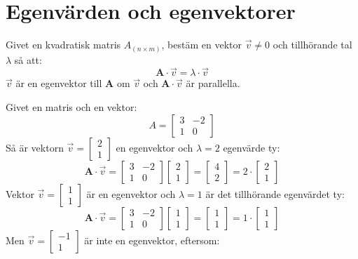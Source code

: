 \section{Egenvärden och egenvektorer} %
\label{sec:egenv_rden_och_egenvektorer}
Givet en kvadratisk matris $A_{(n \times m)}$, bestäm en vektor $\vec{v} \neq 0$ och tillhörande tal $\lambda$ så att:
\[
\mathbf{A} \cdot \vec{v} = \lambda \cdot \vec{v}
\]
$\vec{v}$ är en egenvektor till \textbf{A} om $\vec{v}$ och $\mathbf{A} \cdot \vec{v}$ är parallella.
\begin{Ex}
	Givet en matris och en vektor:
	\[
	A = \begin{bmatrix} 3&-2\\1&0 \end{bmatrix}
	\]
	Så är vektorn $\vec{v} = \begin{bmatrix} 2\\1 \end{bmatrix}$ en egenvektor och $\lambda = 2$ egenvärde ty:
	\[
	\mathbf{A} \cdot \vec{v} = \begin{bmatrix} 3&-2\\1&0 \end{bmatrix} \begin{bmatrix} 2\\1 \end{bmatrix} = \begin{bmatrix} 4\\2 \end{bmatrix} = 2 \cdot \begin{bmatrix} 2\\1 \end{bmatrix}
	\]
	Vektor $\vec{v} = \begin{bmatrix} 1\\1 \end{bmatrix}$ är en egenvektor och $\lambda = 1$ är det tillhörande egenvärdet ty:
	\[
	\mathbf{A} \cdot \vec{v} = \begin{bmatrix} 3&-2\\1&0 \end{bmatrix}\begin{bmatrix} 1\\1 \end{bmatrix} = \begin{bmatrix} 1\\1 \end{bmatrix} = 1 \cdot \begin{bmatrix} 1\\1 \end{bmatrix}
	\]
	Men $\vec{v} = \begin{bmatrix} -1\\1 \end{bmatrix}$ är inte en egenvektor, eftersom:

\end{Ex}
